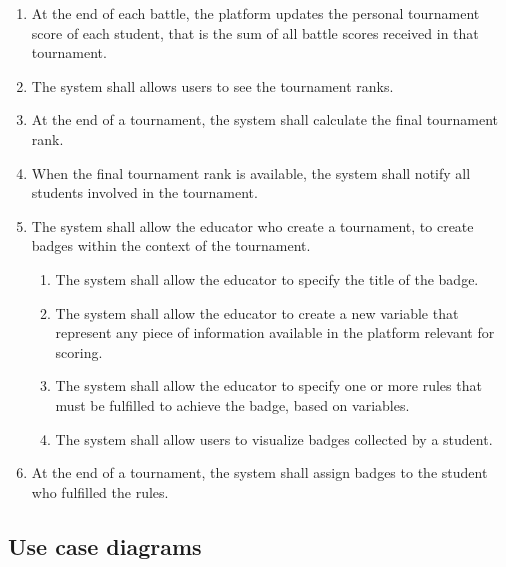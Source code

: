 \begin{enumerate}[label=\textbf{R\arabic*}:,leftmargin=1.3cm]
    \item At the end of each battle, the platform updates the personal tournament score of each student, that is the sum of all battle scores received in that tournament.
    \item The system shall allows users to see the tournament ranks.
    \item At the end of a tournament, the system shall calculate the final tournament rank.
    \item When the final tournament rank is available, the system shall notify all students involved in the tournament.
    \item The system shall allow the educator who create a tournament, to create badges within the context of the tournament.
          \begin{enumerate}[label=\textbf{R\arabic{enumi}.\arabic*}:, leftmargin=*]
              \item The system shall allow the educator to specify the title of the badge.
              \item The system shall allow the educator to create a new variable that represent any piece of information available in the platform relevant for scoring.
              \item The system shall allow the educator to specify one or more rules that must be fulfilled to achieve the badge, based on variables.
              \item The system shall allow users to visualize badges collected by a student.
          \end{enumerate}
    \item At the end of a tournament, the system shall assign badges to the student who fulfilled the rules.
\end{enumerate}
\subsection{Use case diagrams}

